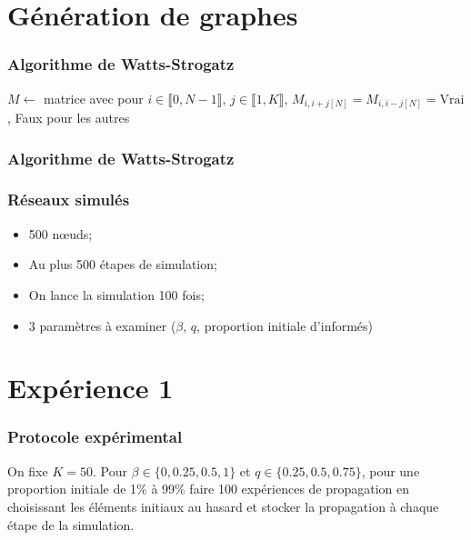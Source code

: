 \documentclass{beamer}
\newcommand{\illustration}[1]{
  \fontsize{8}{10}\selectfont
  \begin{center}
  
  \end{center}
}
\begin{document}
\section{Génération de graphes}
\begin{frame}
  \frametitle{Algorithme de Watts-Strogatz}
  \fontsize{10}{11}\selectfont
  \begin{algorithm}[H]
  $M \leftarrow $ matrice avec pour $i\in \llbracket0,N-1\rrbracket$, $j\in \llbracket1,K\rrbracket$, $M_{i,i+j[N]} = M_{i,i-j[N]} = \text{Vrai}$, Faux pour les autres \;
  \end{algorithm}
\end{frame} 
\begin{frame}
  \frametitle{Algorithme de Watts-Strogatz}
  \only<1-1>{\illustration{WS_1}}
  \only<2-2>{\illustration{WS_2}}
  \only<3-3>{\illustration{WS_3}}
  \only<4-4>{\illustration{WS_4}}
  \only<5-5>{\illustration{WS_5}}
\end{frame}


\begin{frame}
  \frametitle{Réseaux simulés}
  \begin{itemize}
    \item<1-> 500 nœuds;
    \item<2-> Au plus 500 étapes de simulation;
    \item<3-> On lance la simulation 100 fois;
    \item<4-> 3 paramètres à examiner ($\beta$, $q$, proportion initiale d'informés)
  \end{itemize}
\end{frame}

\section{Expérience 1}
\begin{frame}
  \frametitle{Protocole expérimental}
  On fixe $K=50$.
  Pour $\beta \in \{0,0.25,0.5,1\}$ et $q\in \{0.25, 0.5, 0.75\}$, pour une proportion initiale de 1\% à 99\% faire 100 expériences de propagation en choisissant les éléments initiaux au hasard et stocker la propagation à chaque étape de la simulation.

\end{frame}
\end{document}
